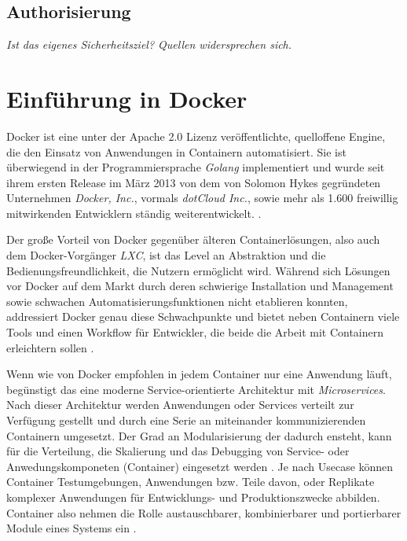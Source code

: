 \documentclass[../main.tex]{subfiles}
\begin{document}
    \subsection{Authorisierung}
      \emph{Ist das eigenes Sicherheitsziel? Quellen widersprechen sich.}

  \section{Einführung in Docker}
  \label{dockerIntro}
    Docker ist eine unter der Apache 2.0 Lizenz veröffentlichte, quelloffene Engine, die den Einsatz von Anwendungen in Containern automatisiert. Sie ist überwiegend in der Programmiersprache \emph{Golang} implementiert und wurde seit ihrem ersten Release im März 2013 von dem von Solomon Hykes gegründeten Unternehmen \emph{Docker, Inc.}\cite{dockerHykes}, vormals \emph{dotCloud Inc.}, sowie mehr als 1.600 freiwillig mitwirkenden Entwicklern ständig weiterentwickelt. \cite{githubDocker}\cite[S.7]{dockerBook}\cite{githubDockerChangelog}\cite{dockerCompany}.





    Der große Vorteil von Docker gegenüber älteren Containerlösungen, also auch dem Docker-Vorgänger \emph{LXC}, ist das Level an Abstraktion und die Bedienungsfreundlichkeit, die Nutzern ermöglicht wird. Während sich Lösungen vor Docker auf dem Markt durch deren schwierige Installation und Management sowie schwachen Automatisierungsfunktionen nicht etablieren konnten, addressiert Docker genau diese Schwachpunkte \cite[S.7]{dockerBook} und bietet neben Containern viele Tools und einen Workflow für Entwickler, die beide die Arbeit mit Containern erleichtern sollen \cite[S.1]{dockerIntroIEEE}.


    Wenn wie von Docker empfohlen in jedem Container nur eine Anwendung läuft, begünstigt das eine moderne Service-orientierte Architektur mit \emph{Microservices}. Nach dieser Architektur werden Anwendungen oder Services verteilt zur Verfügung gestellt und durch eine Serie an miteinander kommunizierenden Containern umgesetzt. Der Grad an Modularisierung der dadurch ensteht, kann für die Verteilung, die Skalierung und das Debugging von Service- oder Anwedungskomponeten (Container) eingesetzt werden \cite[S.9]{dockerBook}. Je nach Usecase können Container Testumgebungen, Anwendungen bzw. Teile davon, oder Replikate komplexer Anwendungen für Entwicklungs- und Produktionszwecke abbilden. Container also nehmen die Rolle austauschbarer, kombinierbarer und portierbarer Module eines Systems ein \cite[S.12]{dockerBook}.
\end{document}
